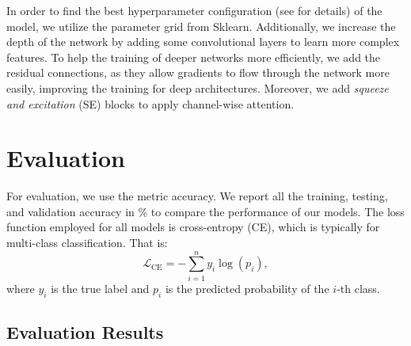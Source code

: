 In order to find the best hyperparameter configuration (see  for details) of the model, 
we utilize the parameter grid from Sklearn.
Additionally, we increase the depth of the network by adding some convolutional layers to learn more complex features. 
To help the training of deeper networks more efficiently, 
we add the residual connections, 
as they allow gradients to flow through the network more easily, improving the training for deep architectures. 
Moreover, 
we add \textit{squeeze and excitation} (SE) blocks to apply channel-wise attention. 

\section{Evaluation}
\label{sec:evaluation}

For evaluation, we use the metric accuracy. 
We report all the training, testing, and validation accuracy in \% to compare the performance of our models. 
The loss function employed for all models is cross-entropy (CE), which is typically for multi-class classification. 
That is:
\begin{equation}
  \mathcal{L}_{\text{CE}} = -\sum_{i=1}^{n} y_i \log(p_i),
\end{equation}
where $y_i$ is the true label and $p_i$ is the predicted probability of the $i$-th class.


\subsection{Evaluation Results}
\label{sec:evaluation:results}


